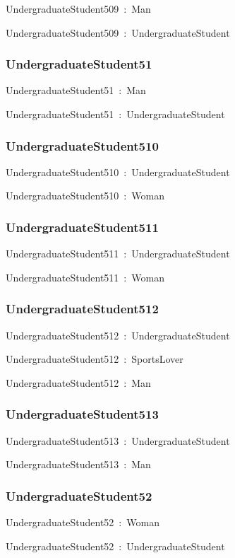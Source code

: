 \documentclass{article}
\begin{document}
UndergraduateStudent509~:~Man

UndergraduateStudent509~:~UndergraduateStudent

\subsubsection*{UndergraduateStudent51}

UndergraduateStudent51~:~Man

UndergraduateStudent51~:~UndergraduateStudent

\subsubsection*{UndergraduateStudent510}

UndergraduateStudent510~:~UndergraduateStudent

UndergraduateStudent510~:~Woman

\subsubsection*{UndergraduateStudent511}

UndergraduateStudent511~:~UndergraduateStudent

UndergraduateStudent511~:~Woman

\subsubsection*{UndergraduateStudent512}

UndergraduateStudent512~:~UndergraduateStudent

UndergraduateStudent512~:~SportsLover

UndergraduateStudent512~:~Man

\subsubsection*{UndergraduateStudent513}

UndergraduateStudent513~:~UndergraduateStudent

UndergraduateStudent513~:~Man

\subsubsection*{UndergraduateStudent52}

UndergraduateStudent52~:~Woman

UndergraduateStudent52~:~UndergraduateStudent
\end{document}
